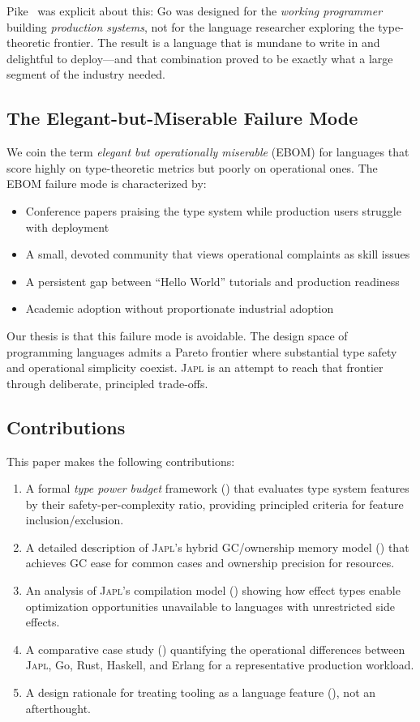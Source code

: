 \documentclass[11pt,twocolumn]{article}
\newcommand{\japl}{\textsc{Japl}}
\begin{document}
Pike~\citep{pike2012go} was explicit about this: Go was designed for the \emph{working programmer} building \emph{production systems}, not for the language researcher exploring the type-theoretic frontier.
The result is a language that is mundane to write in and delightful to deploy---and that combination proved to be exactly what a large segment of the industry needed.

\subsection{The Elegant-but-Miserable Failure Mode}

We coin the term \emph{elegant but operationally miserable} (EBOM) for languages that score highly on type-theoretic metrics but poorly on operational ones.
The EBOM failure mode is characterized by:
\begin{itemize}[leftmargin=*]
\item Conference papers praising the type system while production users struggle with deployment
\item A small, devoted community that views operational complaints as skill issues
\item A persistent gap between ``Hello World'' tutorials and production readiness
\item Academic adoption without proportionate industrial adoption
\end{itemize}

Our thesis is that this failure mode is avoidable.
The design space of programming languages admits a Pareto frontier where substantial type safety and operational simplicity coexist.
\japl{} is an attempt to reach that frontier through deliberate, principled trade-offs.

\subsection{Contributions}

This paper makes the following contributions:
\begin{enumerate}[leftmargin=*]
\item A formal \emph{type power budget} framework () that evaluates type system features by their safety-per-complexity ratio, providing principled criteria for feature inclusion/exclusion.
\item A detailed description of \japl{}'s hybrid GC/ownership memory model () that achieves GC ease for common cases and ownership precision for resources.
\item An analysis of \japl{}'s compilation model () showing how effect types enable optimization opportunities unavailable to languages with unrestricted side effects.
\item A comparative case study () quantifying the operational differences between \japl{}, Go, Rust, Haskell, and Erlang for a representative production workload.
\item A design rationale for treating tooling as a language feature (), not an afterthought.
\end{enumerate}
\end{document}

